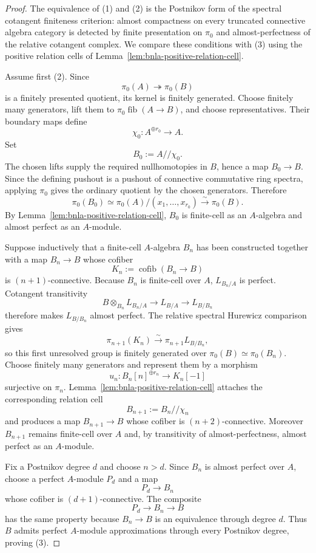 \begin{proof}
The equivalence of (1) and (2) is the Postnikov form of the spectral
cotangent finiteness criterion: almost compactness on every truncated
connective algebra category is detected by finite presentation on $\pi_0$ and
almost-perfectness of the relative cotangent complex.  We compare these
conditions with (3) using the positive relation cells of
Lemma~\ref{lem:bnla-positive-relation-cell}.

Assume first (2).  Since
\[
    \pi_0(A)\twoheadrightarrow\pi_0(B)
\]
is a finitely presented quotient, its kernel is finitely generated.  Choose
finitely many generators, lift them to
$\pi_0\operatorname{fib}(A\to B)$, and choose representatives.  Their
boundary maps define
\[
    \chi_0:A^{\oplus r_0}\longrightarrow A.
\]
Set
\[
    B_0:=A//\chi_0.
\]
The chosen lifts supply the required nullhomotopies in $B$, hence a map
$B_0\to B$.  Since the defining pushout is a pushout of connective
commutative ring spectra, applying $\pi_0$ gives the ordinary quotient by the
chosen generators.  Therefore
\[
    \pi_0(B_0)
    \simeq
    \pi_0(A)/(x_1,\ldots,x_{r_0})
    \xrightarrow{\sim}
    \pi_0(B).
\]
By Lemma~\ref{lem:bnla-positive-relation-cell}, $B_0$ is finite-cell as an
$A$-algebra and almost perfect as an $A$-module.

Suppose inductively that a finite-cell $A$-algebra $B_n$ has been constructed
together with a map $B_n\to B$ whose cofiber
\[
    K_n:=\operatorname{cofib}(B_n\to B)
\]
is $(n+1)$-connective.  Because $B_n$ is finite-cell over $A$,
$L_{B_n/A}$ is perfect.  Cotangent transitivity
\[
    B\otimes_{B_n}L_{B_n/A}
    \longrightarrow
    L_{B/A}
    \longrightarrow
    L_{B/B_n}
\]
therefore makes $L_{B/B_n}$ almost perfect.  The relative spectral Hurewicz
comparison gives
\[
    \pi_{n+1}(K_n)
    \xrightarrow{\sim}
    \pi_{n+1}L_{B/B_n},
\]
so this first unresolved group is finitely generated over
$\pi_0(B)\simeq\pi_0(B_n)$.  Choose finitely many generators and represent
them by a morphism
\[
    u_n:B_n[n]^{\oplus r_n}\longrightarrow K_n[-1]
\]
surjective on $\pi_n$.  Lemma~\ref{lem:bnla-positive-relation-cell} attaches
the corresponding relation cell
\[
    B_{n+1}:=B_n//\chi_n
\]
and produces a map $B_{n+1}\to B$ whose cofiber is $(n+2)$-connective.
Moreover $B_{n+1}$ remains finite-cell over $A$ and, by transitivity of
almost-perfectness, almost perfect as an $A$-module.

Fix a Postnikov degree $d$ and choose $n>d$.  Since $B_n$ is almost perfect
over $A$, choose a perfect $A$-module $P_d$ and a map
\[
    P_d\longrightarrow B_n
\]
whose cofiber is $(d+1)$-connective.  The composite
\[
    P_d\longrightarrow B_n\longrightarrow B
\]
has the same property because $B_n\to B$ is an equivalence through degree
$d$.  Thus $B$ admits perfect $A$-module approximations through every
Postnikov degree, proving (3).


\end{proof}
